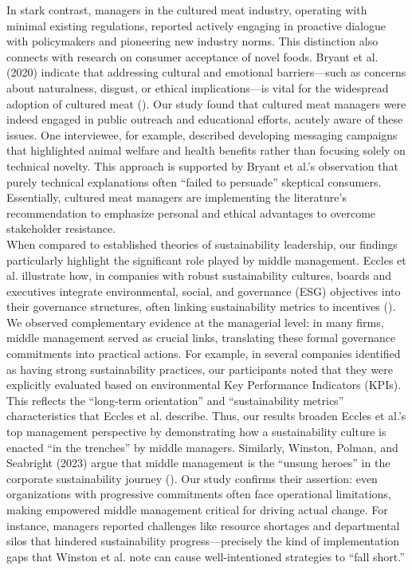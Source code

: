 	In stark contrast, managers in the cultured meat industry, operating with minimal existing regulations, reported actively engaging in proactive dialogue with policymakers and pioneering new industry norms. This distinction also connects with research on consumer acceptance of novel foods. Bryant et al. (2020) indicate that addressing cultural and emotional barriers—such as concerns about naturalness, disgust, or ethical implications—is vital for the widespread adoption of cultured meat (\textcite{Bryant2020}). Our study found that cultured meat managers were indeed engaged in public outreach and educational efforts, acutely aware of these issues. One interviewee, for example, described developing messaging campaigns that highlighted animal welfare and health benefits rather than focusing solely on technical novelty. This approach is supported by Bryant et al.’s observation that purely technical explanations often ``failed to persuade'' skeptical consumers. Essentially, cultured meat managers are implementing the literature’s recommendation to emphasize personal and ethical advantages to overcome stakeholder resistance. \\
	
	When compared to established theories of sustainability leadership, our findings particularly highlight the significant role played by middle management. Eccles et al. illustrate how, in companies with robust sustainability cultures, boards and executives integrate environmental, social, and governance (ESG) objectives into their governance structures, often linking sustainability metrics to incentives (\textcite{Eccles2014}). We observed complementary evidence at the managerial level: in many firms, middle management served as crucial links, translating these formal governance commitments into practical actions. For example, in several companies identified as having strong sustainability practices, our participants noted that they were explicitly evaluated based on environmental Key Performance Indicators (KPIs). This reflects the ``long-term orientation'' and ``sustainability metrics'' characteristics that Eccles et al. describe. Thus, our results broaden Eccles et al.’s top management perspective by demonstrating how a sustainability culture is enacted ``in the trenches'' by middle managers. Similarly, Winston, Polman, and Seabright (2023) argue that middle management is the ``unsung heroes'' in the corporate sustainability journey (\textcite{Winston2023}). Our study confirms their assertion: even organizations with progressive commitments often face operational limitations, making empowered middle management critical for driving actual change. For instance, managers reported challenges like resource shortages and departmental silos that hindered sustainability progress—precisely the kind of implementation gaps that Winston et al. note can cause well-intentioned strategies to ``fall short.'' \\
	
